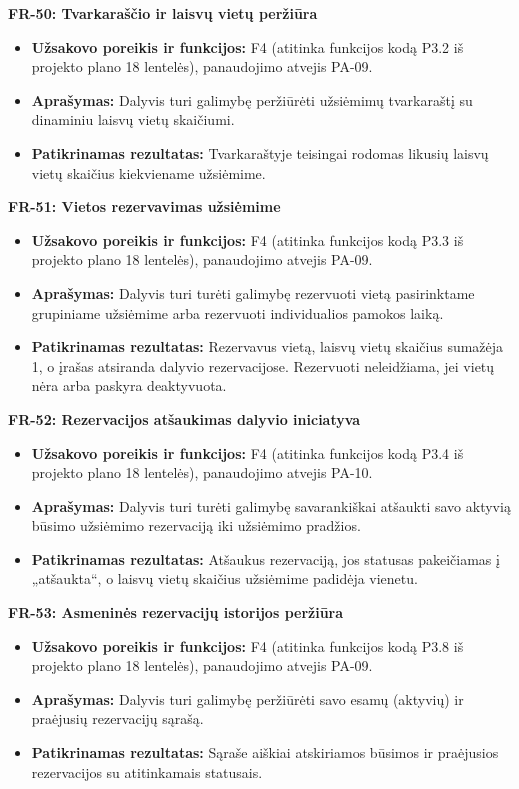 \vspace{0.3cm}
\noindent\textbf{FR-50: Tvarkaraščio ir laisvų vietų peržiūra}
\begin{itemize}
    \item \textbf{Užsakovo poreikis ir funkcijos:} F4 (atitinka funkcijos kodą P3.2 iš projekto plano 18 lentelės), panaudojimo atvejis PA-09.
    \item \textbf{Aprašymas:} Dalyvis turi galimybę peržiūrėti užsiėmimų tvarkaraštį su dinaminiu laisvų vietų skaičiumi.
    \item \textbf{Patikrinamas rezultatas:} Tvarkaraštyje teisingai rodomas likusių laisvų vietų skaičius kiekviename užsiėmime.
\end{itemize}

\vspace{0.3cm}
\noindent\textbf{FR-51: Vietos rezervavimas užsiėmime}
\begin{itemize}
    \item \textbf{Užsakovo poreikis ir funkcijos:} F4 (atitinka funkcijos kodą P3.3 iš projekto plano 18 lentelės), panaudojimo atvejis PA-09.
    \item \textbf{Aprašymas:} Dalyvis turi turėti galimybę rezervuoti vietą pasirinktame grupiniame užsiėmime arba rezervuoti individualios pamokos laiką.
    \item \textbf{Patikrinamas rezultatas:} Rezervavus vietą, laisvų vietų skaičius sumažėja 1, o įrašas atsiranda dalyvio rezervacijose. Rezervuoti neleidžiama, jei vietų nėra arba paskyra deaktyvuota.
\end{itemize}

\vspace{0.3cm}
\noindent\textbf{FR-52: Rezervacijos atšaukimas dalyvio iniciatyva}
\begin{itemize}
    \item \textbf{Užsakovo poreikis ir funkcijos:} F4 (atitinka funkcijos kodą P3.4 iš projekto plano 18 lentelės), panaudojimo atvejis PA-10.
    \item \textbf{Aprašymas:} Dalyvis turi turėti galimybę savarankiškai atšaukti savo aktyvią būsimo užsiėmimo rezervaciją iki užsiėmimo pradžios.
    \item \textbf{Patikrinamas rezultatas:} Atšaukus rezervaciją, jos statusas pakeičiamas į „atšaukta“, o laisvų vietų skaičius užsiėmime padidėja vienetu.
\end{itemize}

\vspace{0.3cm}
\noindent\textbf{FR-53: Asmeninės rezervacijų istorijos peržiūra}
\begin{itemize}
    \item \textbf{Užsakovo poreikis ir funkcijos:} F4 (atitinka funkcijos kodą P3.8 iš projekto plano 18 lentelės), panaudojimo atvejis PA-09.
    \item \textbf{Aprašymas:} Dalyvis turi galimybę peržiūrėti savo esamų (aktyvių) ir praėjusių rezervacijų sąrašą.
    \item \textbf{Patikrinamas rezultatas:} Sąraše aiškiai atskiriamos būsimos ir praėjusios rezervacijos su atitinkamais statusais.
\end{itemize}

